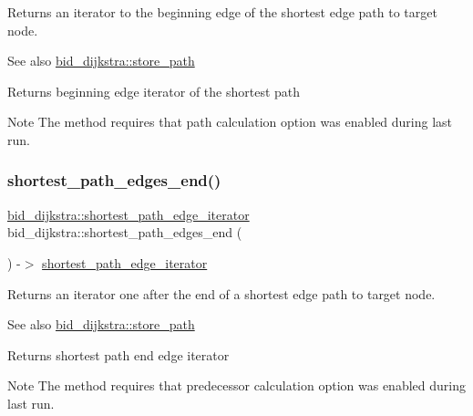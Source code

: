 Returns an iterator to the beginning edge of the shortest edge path to target node. 

\begin{DoxySeeAlso}{See also}
\mbox{\hyperlink{classbid__dijkstra_aa095beede9c50b1f1e482049a2a4b619}{bid\+\_\+dijkstra\+::store\+\_\+path}}
\end{DoxySeeAlso}
\begin{DoxyReturn}{Returns}
beginning edge iterator of the shortest path
\end{DoxyReturn}
\begin{DoxyNote}{Note}
The method requires that path calculation option was enabled during last run. 
\end{DoxyNote}
\mbox{\label{classbid__dijkstra_a1bafedb79a967012255d93262a6a18e1}} 
\subsubsection{\texorpdfstring{shortest\+\_\+path\+\_\+edges\+\_\+end()}{shortest\_path\_edges\_end()}}
{\footnotesize\ttfamily \mbox{\hyperlink{classbid__dijkstra_a703d0faf9568bc25a9305faa61412fe1}{bid\+\_\+dijkstra\+::shortest\+\_\+path\+\_\+edge\+\_\+iterator}} bid\+\_\+dijkstra\+::shortest\+\_\+path\+\_\+edges\+\_\+end (\begin{DoxyParamCaption}{ }\end{DoxyParamCaption}) -\/$>$ \mbox{\hyperlink{classbid__dijkstra_a703d0faf9568bc25a9305faa61412fe1}{shortest\+\_\+path\+\_\+edge\+\_\+iterator}}}



Returns an iterator one after the end of a shortest edge path to target node. 

\begin{DoxySeeAlso}{See also}
\mbox{\hyperlink{classbid__dijkstra_aa095beede9c50b1f1e482049a2a4b619}{bid\+\_\+dijkstra\+::store\+\_\+path}}
\end{DoxySeeAlso}
\begin{DoxyReturn}{Returns}
shortest path end edge iterator
\end{DoxyReturn}
\begin{DoxyNote}{Note}
The method requires that predecessor calculation option was enabled during last run. 
\end{DoxyNote}
\mbox{\label{classbid__dijkstra_a962906e4dab0dc65ed7aa6afe4ec966c}} 
